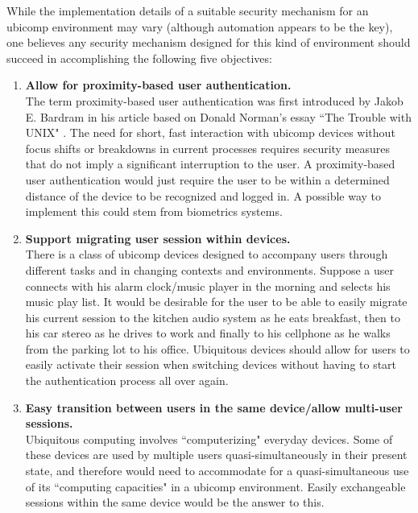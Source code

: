 \documentclass{article}
\begin{document}
While the implementation details of a suitable security mechanism for an ubicomp environment may vary (although automation appears to be the key), one believes any security mechanism designed for this kind of environment should succeed in accomplishing the following five objectives:

\begin{enumerate}
 \item \textbf{Allow for proximity-based user authentication.}\\
 The term proximity-based user authentication was first introduced by Jakob E. Bardram \cite{bardram2005trouble} in his article based on Donald Norman's essay ``The Trouble with UNIX" \cite{norman1981trouble}. The need for short, fast interaction with ubicomp devices without focus shifts or breakdowns in current processes requires security measures that do not imply a significant interruption to the user. A proximity-based user authentication would just require the user to be within a determined distance of the device to be recognized and logged in. A possible way to implement this could stem from biometrics systems. 
 
 \item \textbf{Support migrating user session within devices.}\\
 There is a class of ubicomp devices designed to accompany users through different tasks and in changing contexts and environments. Suppose a user connects with his alarm clock/music player in the morning and selects his music play list. It would be desirable for the user to be able to easily migrate his current session to the kitchen audio system as he eats breakfast, then to his car stereo as he drives to work and finally to his cellphone as he walks from the parking lot to his office. Ubiquitous devices should allow for users to easily activate their session when switching devices without having to start the authentication process all over again. 
 
 \item \textbf{Easy transition between users in the same device/allow multi-user sessions.}\\
 Ubiquitous computing involves ``computerizing" everyday devices. Some of these devices are used by multiple users quasi-simultaneously in their present state, and therefore would need to accommodate for a quasi-simultaneous use of its ``computing capacities" in a ubicomp environment. Easily exchangeable sessions within the same device would be the answer to this.
 

\end{enumerate}
\end{document}
